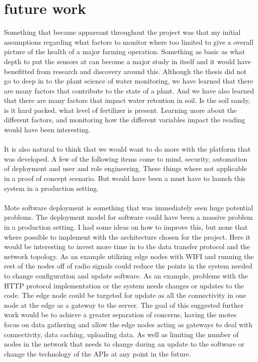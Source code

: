 \documentclass[]{uiophd}
\begin{document}
\section{future work}
Something that became appareant throughout the project was that my initial assumptions regarding what factors to monitor where too limited to give  a overall picture of the health of a major farming operation. Something as basic as what depth to put the sensors at can become a  major study in itself and it would have benefitted from research and discovery around this. Although the thesis did not go to deep in to the plant science of water monitoring, we have learned that there are many factors that contribute to the state of a plant. And we have also learned that there are many factors that impact water retention in soil. Is the soil sandy, is it hard packed, what level of fertilizer is present. Learning more about the different factors, and monitoring how the different variables impact the reading would have been interesting.
\\\\
It is also natural to think that we would want to do more with the platform that was developed. A few of the following items come to mind, security, automation of deployment and user and role engineering. These things where not applicable in a proof of concept scenario. But would have been a must have to  launch this system in a production setting.
\\\\
Mote software deployment is something that was immediately seen huge potential problems. The deployment model for software could have been a massive problem in a production setting. I had some ideas on how to improve this, but none that where possible to implement with the architecture chosen for the project. Here it would be interesting to invest more time in to the data transfer protocol and the network topology. As an example utilizing edge nodes with WIFI and running the rest of the nodes off of radio signals could reduce the points in the system needed to change configuration and update software. As an example, problems with the HTTP protocol implementation or the system needs changes or updates to the code. The edge node could be targeted for update as all the connectivity in one node at the edge as a gateway to the server. The goal of this suggested further work would be to achieve a greater separation of concerns, having the motes focus on data gathering and allow the edge nodes acting as gateways to deal with connectivity, data caching, uploading data. As well as limiting the number of nodes in the network that needs to change during an update to the software or change the technology of the APIs at any point in the future.
\end{document}
